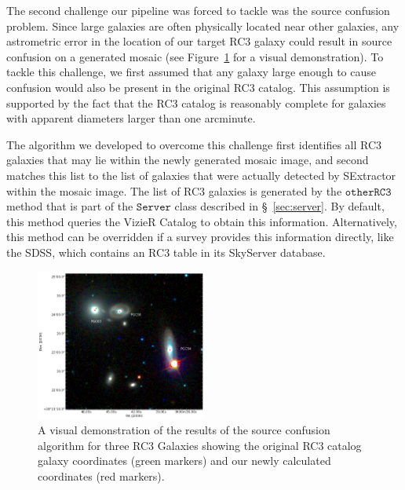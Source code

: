 \documentclass[authoryear, 12pt, 5p, times]{elsarticle}
\begin{document}
The second challenge our pipeline was forced to tackle was the source confusion problem. Since large galaxies are often physically located near other galaxies, any astrometric error in the location of our target RC3 galaxy could result in source confusion on a generated mosaic (see Figure~\ref{fig:positional_update_plot} for a visual demonstration). To tackle this challenge, we first assumed that any galaxy large enough to cause confusion would also be present in the original RC3 catalog. This assumption is supported by the fact that the RC3 catalog is reasonably complete for galaxies with apparent diameters larger than one arcminute. 

The algorithm we developed to overcome this challenge first identifies all RC3 galaxies that may lie within the newly generated mosaic image, and second matches this list to the list of galaxies that were actually detected by SExtractor within the mosaic image. The list of RC3 galaxies is generated by the $\texttt{otherRC3}$ method that is part of the $\texttt{Server}$ class described in \S~\ref{sec:server}. By default, this method queries the VizieR Catalog to obtain this information. Alternatively, this method can be overridden if a survey provides this information directly, like the SDSS, which contains an RC3 table in its SkyServer database. 

\begin{figure}[h]
\includegraphics[width=0.5\textwidth]{figures/navigator}
\caption{A visual demonstration of the results of the source confusion algorithm for three RC3 Galaxies showing the original RC3 catalog galaxy coordinates (green markers) and our newly calculated coordinates (red markers).}
\label{fig:positional_update_plot}
\end{figure}
\end{document}
